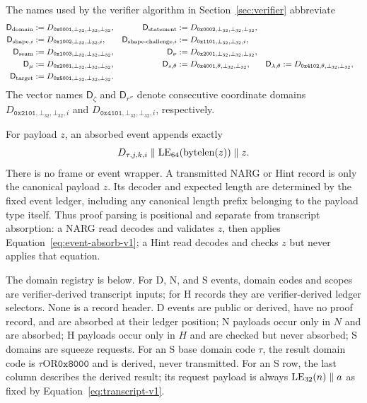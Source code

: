 The names used by the verifier algorithm in Section~\ref{sec:verifier}
abbreviate
\begin{equation}
 \begin{aligned}
  \mathsf D_{\rm domain}&:=D_{\mathtt{0x0001},\bot_{32},\bot_{32},\bot_{32}},&
  \mathsf D_{\rm statement}&:=D_{\mathtt{0x0002},\bot_{32},\bot_{32},\bot_{32}},\\
  \mathsf D_{{\rm shape},i}&:=D_{\mathtt{0x1002},\bot_{32},\bot_{32},i},&
  \mathsf D_{{\rm shape\text{-}challenge},i}&:=
    D_{\mathtt{0x1101},\bot_{32},\bot_{32},i},\\
  \mathsf D_{\rm seam}&:=D_{\mathtt{0x1003},\bot_{32},\bot_{32},\bot_{32}},&
  \mathsf D_{\nu}&:=D_{\mathtt{0x2001},\bot_{32},\bot_{32},\bot_{32}},\\
  \mathsf D_{\mu}&:=D_{\mathtt{0x2081},\bot_{32},\bot_{32},\bot_{32}},&
  \mathsf D_{s,\theta}&:=D_{\mathtt{0x4001},\theta,\bot_{32},\bot_{32}},&
  \mathsf D_{\lambda,\theta}&:=D_{\mathtt{0x4102},\theta,\bot_{32},\bot_{32}},\\
  \mathsf D_{\rm target}&:=D_{\mathtt{0x5001},\bot_{32},\bot_{32},\bot_{32}}.&&
 \end{aligned}
 \label{eq:verifier-domain-abbreviations}
\end{equation}
The vector names $\mathsf D_\zeta$ and $\mathsf D_{r''}$ denote consecutive
coordinate domains $D_{\mathtt{0x2101},\bot_{32},\bot_{32},i}$ and
$D_{\mathtt{0x4101},\bot_{32},\bot_{32},i}$, respectively.

For payload $z$, an absorbed event appends exactly
\begin{equation}
 D_{\tau,j,k,i}
 \parallel\operatorname{LE}_{64}(\operatorname{bytelen}(z))\parallel z.
 \label{eq:event-absorb-v1}
\end{equation}
There is no frame or event wrapper.  A transmitted NARG or Hint record is only
the canonical payload $z$.  Its decoder and expected length are determined by
the fixed event ledger, including any canonical length prefix belonging to the
payload type itself.  Thus proof parsing is positional and separate from
transcript absorption: a NARG read decodes and validates $z$, then applies
Equation~\eqref{eq:event-absorb-v1}; a Hint read decodes and checks $z$ but
never applies that equation.

The domain registry is below.  For \textsf{D}, \textsf{N}, and \textsf{S}
events, domain codes and scopes are verifier-derived transcript inputs; for
\textsf{H} records they are verifier-derived ledger selectors.  None is a
record header.  \textsf{D} events are public or derived, have no proof record,
and are absorbed at their ledger position; \textsf{N} payloads occur only in
$N$ and are absorbed; \textsf{H} payloads occur only in $H$ and are checked but never absorbed;
\textsf{S} domains are squeeze requests.  For an \textsf{S} base domain code $\tau$, the
result domain code is $\tau\mathbin{\mathrm{OR}}\mathtt{0x8000}$ and is derived,
never transmitted.  For an \textsf{S} row, the last column describes the
derived result; its request payload is always $\operatorname{LE}_{32}(n)\parallel a$ as fixed
by Equation~\eqref{eq:transcript-v1}.

